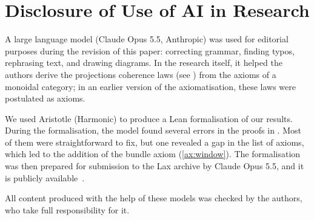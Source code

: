 \section*{Disclosure of Use of AI in Research}

A large language model (Claude Opus 5.5, Anthropic) was used for editorial purposes during the revision of this paper: correcting grammar, finding typos, rephrasing text, and drawing diagrams. In the research itself, it helped the authors derive the projections coherence laws (see ) from the axioms of a monoidal category; in an earlier version of the axiomatisation, these laws were postulated as axioms.

We used Aristotle (Harmonic) to produce a Lean formalisation of our results. During the formalisation, the model found several errors in the proofs in \appendixplace. Most of them were straightforward to fix, but one revealed a gap in the list of axioms, which led to the addition of the bundle axiom (\cref{ax:window}). The formalisation was then prepared for submission to the Lax archive by Claude Opus 5.5, and it is publicly available~\cite{lax-149335}.

All content produced with the help of these models was checked by the authors, who take full responsibility for it.